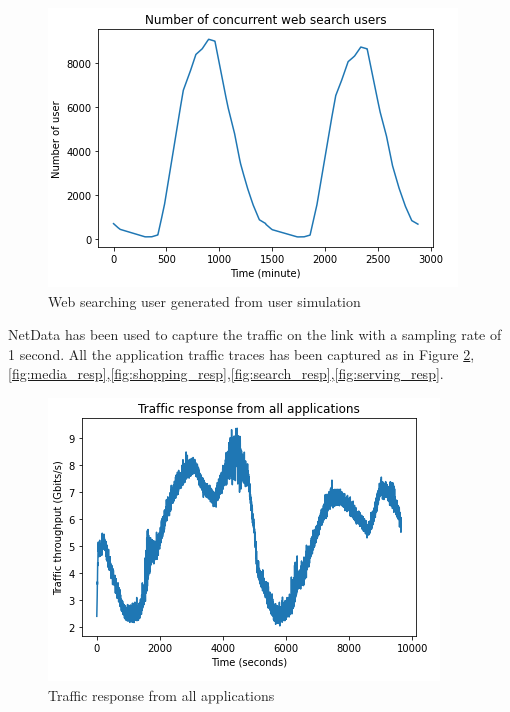 \documentclass[conference]{IEEEtran}
\begin{document}
\begin{figure}[]
    \centering
        \includegraphics[scale = 0.8]{imgs/web_search_concurrent_users_2days.png}
        \caption{Web searching user generated from user simulation}
        \label{fig:webSearching_user}
    \end{figure}

NetData \cite{netdata} has been used to capture the traffic on the link with a sampling rate of 1 second. All the application traffic traces has been captured as in Figure \ref{fig:all_app_resp},\ref{fig:media_resp},\ref{fig:shopping_resp},\ref{fig:search_resp},\ref{fig:serving_resp}. 

\begin{figure}[]
    \centering
        \includegraphics[scale = 0.8]{imgs/agrregated_traffic_all_apps.png}
        \caption{Traffic response from all applications}
        \label{fig:all_app_resp}
    \end{figure}
\end{document}

